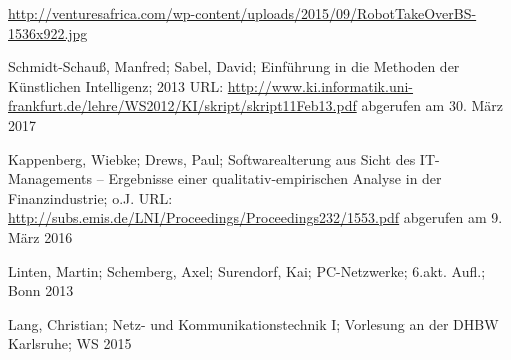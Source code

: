 \begin{thebibliography}{9999}
 \url{http://venturesafrica.com/wp-content/uploads/2015/09/RobotTakeOverBS-1536x922.jpg}



 Schmidt-Schauß, Manfred; Sabel, David; Einführung in die Methoden der
Künstlichen Intelligenz; 2013 URL: \url{http://www.ki.informatik.uni-frankfurt.de/lehre/WS2012/KI/skript/skript11Feb13.pdf} abgerufen am 30. März 2017

 
 Kappenberg, Wiebke; Drews, Paul; Softwarealterung aus Sicht des IT-Managements – Ergebnisse einer qualitativ-empirischen Analyse in der Finanzindustrie; o.J. URL: \url{http://subs.emis.de/LNI/Proceedings/Proceedings232/1553.pdf} abgerufen am 9. März 2016

 Linten, Martin; Schemberg, Axel; Surendorf, Kai; PC-Netzwerke; 6.akt. Aufl.; Bonn 2013

 Lang, Christian; Netz- und Kommunikationstechnik I; Vorlesung an der DHBW Karlsruhe; WS 2015

\end{thebibliography}
